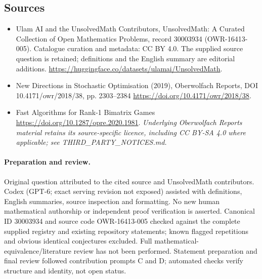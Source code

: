 \documentclass[11pt]{article}
\begin{document}
\subsection{Sources}
\begin{itemize}
\item[\hypertarget{source:30003934:1}{S1}] Ulam AI and the UnsolvedMath Contributors, UnsolvedMath: A Curated Collection of Open Mathematics Problems, record 30003934 (OWR-16413-005). Catalogue curation and metadata: CC BY 4.0. The supplied source question is retained; definitions and the English summary are editorial additions.
\url{https://huggingface.co/datasets/ulamai/UnsolvedMath}.
\item[\hypertarget{source:30003934:2}{S2}] New Directions in Stochastic Optimisation (2019), Oberwolfach Reports, DOI 10.4171/owr/2018/38, pp. 2303--2384
\url{https://doi.org/10.4171/owr/2018/38}.
\item[\hypertarget{source:30003934:3}{S3}] Fast Algorithms for Rank-1 Bimatrix Games
\url{https://doi.org/10.1287/opre.2020.1981}.
\textit{Underlying Oberwolfach Reports material retains its source-specific licence, including CC BY-SA 4.0 where applicable; see THIRD\_PARTY\_NOTICES.md.}
\end{itemize}
\paragraph{Preparation and review.}
Original question attributed to the cited source and UnsolvedMath contributors. Codex (GPT-6; exact serving revision not exposed) assisted with definitions, English summaries, source inspection and formatting. No new human mathematical authorship or independent proof verification is asserted. Canonical ID 30003934 and source code OWR-16413-005 checked against the complete supplied registry and existing repository statements; known flagged repetitions and obvious identical conjectures excluded. Full mathematical-equivalence/literature review has not been performed. Statement preparation and final review followed contribution prompts C and D; automated checks verify structure and identity, not open status.
\label{end:30003934}
\end{document}

